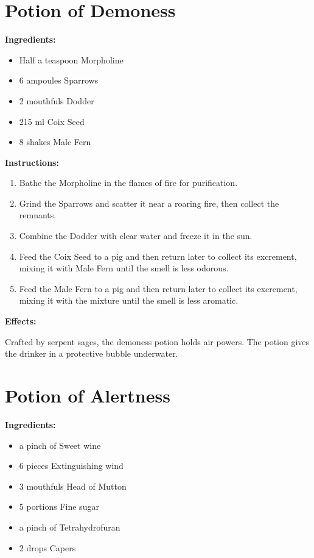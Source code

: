 \documentclass{article}
\begin{document}
\newpage
\section*{Potion of Demoness}

\textbf{Ingredients:}

\begin{itemize}
  \item Half a teaspoon Morpholine
  \item 6 ampoules Sparrows
  \item 2 mouthfuls Dodder
  \item 215 ml Coix Seed
  \item 8 shakes Male Fern
\end{itemize}

\textbf{Instructions:}

\begin{enumerate}
  \item Bathe the Morpholine in the flames of fire for purification.
  \item Grind the Sparrows and scatter it near a roaring fire, then collect the remnants.
  \item Combine the Dodder with clear water and freeze it in the sun.
  \item Feed the Coix Seed to a pig and then return later to collect its excrement, mixing it with Male Fern until the smell is less odorous.
  \item Feed the Male Fern to a pig and then return later to collect its excrement, mixing it with the mixture until the smell is less aromatic.
\end{enumerate}

\textbf{Effects:}

Crafted by serpent sages, the demoness potion holds air powers. The potion gives the drinker in a protective bubble underwater.

\newpage
\section*{Potion of Alertness}

\textbf{Ingredients:}

\begin{itemize}
  \item a pinch of Sweet wine
  \item 6 pieces Extinguishing wind
  \item 3 mouthfuls Head of Mutton
  \item 5 portions Fine sugar
  \item a pinch of Tetrahydrofuran
  \item 2 drops Capers
\end{itemize}
\end{document}
